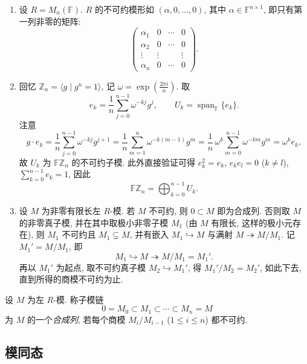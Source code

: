 \begin{example}\label{ex:Mn-irreducible-modules}
\mbox{}\par\vspace{-0.2em}
\begin{enumerate}
  \item 设 $R=M_n(\mathbb{F})$. $R$ 的不可约模形如 $(\alpha,0,\dots,0)$, 其中 $\alpha\in \mathbb{F}^{n\times1}$,
  即只有第一列非零的矩阵:
  \[
    \begin{pmatrix}
      \alpha_1 & 0 & \cdots & 0\\
      \alpha_2 & 0 & \cdots & 0\\
      \vdots & \vdots & & \vdots\\
      \alpha_n & 0 & \cdots & 0
    \end{pmatrix}.
  \]
  \item 回忆 $\mathbb{Z}_n=\langle g\mid g^n=1\rangle$, 记 $\omega=\exp\left(\frac{2\pi i}{n}\right)$.
  取
  \[
    e_k=\frac{1}{n}\sum_{j=0}^{n-1}\omega^{-kj}g^j,\qquad
    U_k=\operatorname{span}_{\mathbb{F}}\{e_k\}.
  \]
  注意
  \[
    g\cdot e_k=\frac{1}{n}\sum_{j=0}^{n-1}\omega^{-kj}g^{j+1}
    =\frac{1}{n}\sum_{m=1}^{n}\omega^{-k(m-1)}g^{m}
    =\frac{1}{n}\,\omega^{k}\sum_{m=0}^{n-1}\omega^{-km}g^{m}=\omega^{k}e_k,
  \]
  故 $U_k$ 为 $\mathbb{F}\mathbb{Z}_n$ 的不可约子模.
  此外直接验证可得 $e_k^2=e_k$, $e_ke_l=0$ ($k\neq l$), $\sum_{k=0}^{n-1}e_k=1$, 因此
  \[
    \mathbb{F}\mathbb{Z}_n=\bigoplus_{k=0}^{n-1}U_k .
  \]
  \item 设 $M$ 为非零有限长左 $R$-模. 若 $M$ 不可约, 则 $0\subset M$ 即为合成列.
  否则取 $M$ 的非零真子模, 并在其中取极小非零子模 $M_1$ (由 $M$ 有限长, 这样的极小元存在),
  则 $M_1$ 不可约且 $M_1\subsetneq M$,
  并有嵌入 $M_1\hookrightarrow M$
  与满射 $M\twoheadrightarrow M/M_1$. 记 $M_1'=M/M_1$, 即
  \[
    M_1\hookrightarrow M\twoheadrightarrow M/M_1=M_1' .
  \]
  再以 $M_1'$ 为起点, 取不可约真子模 $M_2\hookrightarrow M_1'$, 得 $M_1'/M_2=M_2'$,
  如此下去, 直到所得的商模不可约为止.
\end{enumerate}
\end{example}

\begin{definition}[合成列]\label{def:composition-series}
设 $M$ 为左 $R$-模. 称子模链
\[
  0=M_0\subset M_1\subset\cdots\subset M_n=M
\]
为 $M$ 的一个\emph{合成列}, 若每个商模 $M_i/M_{i-1}$ ($1\le i\le n$) 都不可约.
\end{definition}

\subsection{模同态}

